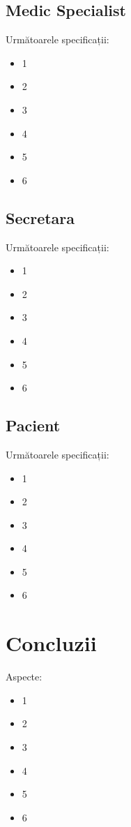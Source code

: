 \documentclass[a4paper,12pt]{article}
\begin{document}
\subsection{Medic Specialist}

Următoarele specificații:

\begin{itemize}
\item 1
\item 2
\item 3
\item 4
\item 5
\item 6
\end{itemize}

\subsection{Secretara}

Următoarele specificații:

\begin{itemize}
\item 1
\item 2
\item 3
\item 4
\item 5
\item 6
\end{itemize}

\subsection{Pacient}

Următoarele specificații:

\begin{itemize}
\item 1
\item 2
\item 3
\item 4
\item 5
\item 6
\end{itemize}

\section{Concluzii}

Aspecte:

\begin{itemize}
\item 1
\item 2
\item 3
\item 4
\item 5
\item 6
\end{itemize}
\end{document}
